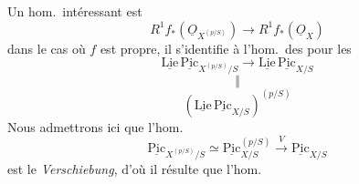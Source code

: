 \documentclass[11pt,a4paper]{article}
\begin{document}
Un hom.\ intéressant est
\[
R^{1}f_{*}(\underline{O}_{X^{(p/S)}}) \longrightarrow R^{1}f_{*}(\underline{O}_{X})
\]
dans le cas où $f$ est propre,  \struck{\ill{}} il s'identifie à l'hom.\ des  pour les  
\[
\underline{\mathrm{Lie}}\,\underline{\mathrm{Pic}}_{X^{(p/S)}/S} \longrightarrow \underline{\mathrm{Lie}}\,\underline{\mathrm{Pic}}_{X/S}
\]
\[
\Vert
\]
\[
(\underline{\mathrm{Lie}}\,\underline{\mathrm{Pic}}_{X/S})^{(p/S)}
\]
Nous admettrons ici que l'hom.\ \struck{\ill{}}
\[
\underline{\mathrm{Pic}}_{X^{(p/S)}/S} \simeq \underline{\mathrm{Pic}}^{(p/S)}_{X/S} \xrightarrow{\ V\ } \underline{\mathrm{Pic}}_{X/S}
\]
est le \emph{Verschiebung}, d'où il résulte que l'hom.
\end{document}
